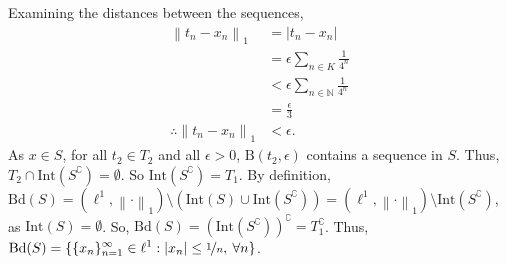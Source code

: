 \documentclass[a4paper,11pt]{article}
\newcommand{\norm}[1]{\left\lVert#1\right\rVert}
\newcommand{\ds}{\displaystyle}
\begin{document}
{{\begin{enumerate}[leftmargin=*]
		\bigbreak
		Examining the distances between the sequences,
		\begin{align*}
			\norm{t_n - x_n}_1 & = |t_n - x_n| \\
							   & = \epsilon \sum_{n \in K} \frac{1}{4^n} \\
							   & < \epsilon \sum_{n \in \mathbb{N}} \frac{1}{4^n} \\
							   & = \frac{\epsilon}{3} \\
			\therefore \norm{t_n - x_n}_1 & < \epsilon.
		\end{align*}
		As $\ds{x \in S}$, for all $\ds{t_2 \in T_2}$ and all $\ds{\epsilon > 0}$, $\ds{\text{B}(t_2,\epsilon)}$ contains a sequence in $\ds{S}$. Thus, $\ds{T_2 \cap \text{Int}(S^{\complement}) = \emptyset}$. So $\ds{\text{Int}(S^{\complement}) = T_1}$. By definition, $\ds{\text{Bd}(S) = (\ell^1, \norm{\cdot}_1) \setminus (\text{Int}(S) \cup \text{Int}(S^{\complement})) = (\ell^1, \norm{\cdot}_1) \setminus \text{Int}(S^{\complement})}$, as $\ds{\text{Int}(S) = \emptyset}$. So, $\ds{\text{Bd}(S) = \left(\text{Int}(S^{\complement})\right)^{\complement} = T_1^{\complement}}$. Thus, $\ds{\text{Bd}(S) = \{\{x_n\}_{n=1}^{\infty} \in \ell^1 : |x_n| \leq \nicefrac{1}{n}, \: \forall n\}}$.

			\bigbreak


\end{enumerate}}}
\end{document}
